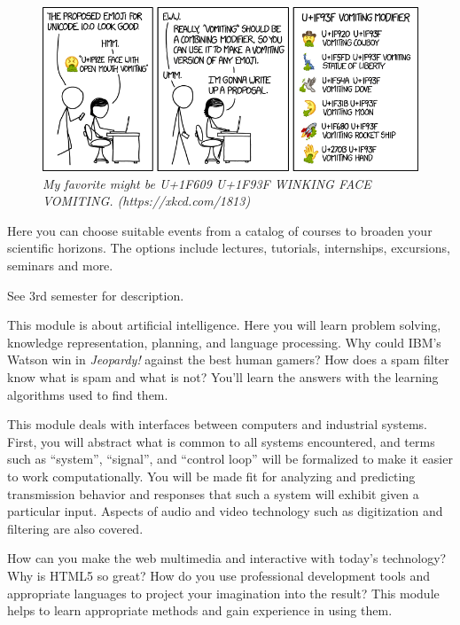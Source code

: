 \begin{figure}[b!]
\centering
\includegraphics[scale=.4]{img/xkcd/vomiting_emoji.png}
\caption*{{\small \textit{My favorite might be U+1F609 U+1F93F WINKING FACE VOMITING\@. (https://xkcd.com/1813)}}}
\end{figure}
\pagebreak
{}

Here you can choose suitable events from a catalog of courses to broaden your scientific horizons.
The options include lectures, tutorials, internships, excursions, seminars and more.

See 3rd semester for description.

This module is about artificial intelligence.
Here you will learn problem solving, knowledge representation, planning, and language processing.
Why could IBM's Watson win in \textit{Jeopardy!} against the best human gamers?
How does a spam filter know what is spam and what is not?
You'll learn the answers with the learning algorithms used to find them.

This module deals with interfaces between computers and industrial systems.
First, you will abstract what is common to all systems encountered, and terms such as \enquote{system}, \enquote{signal}, and \enquote{control loop} will be formalized to make it easier to work computationally.
You will be made fit for analyzing and predicting transmission behavior and responses that such a system will exhibit given a particular input.
Aspects of audio and video technology such as digitization and filtering are also covered.

How can you make the web multimedia and interactive with today's technology? Why is HTML5 so great?
How do you use professional development tools and appropriate languages to project your imagination into the result?
This module helps to learn appropriate methods and gain experience in using them.

